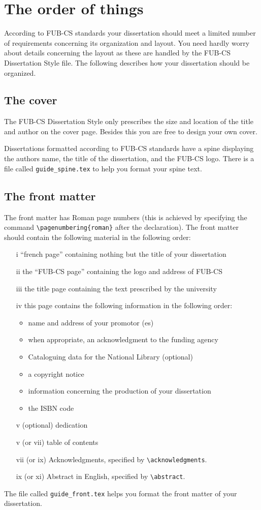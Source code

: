 \chapter{The order of things}
According to FUB-CS standards your dissertation should meet a limited number
of requirements concerning its organization and layout. You need hardly 
worry about details concerning the layout as these are handled by the
FUB-CS Dissertation Style file. The following describes how your dissertation
should be organized.

\section{The cover}
The FUB-CS Dissertation Style only prescribes the size and location 
of the title and author on the cover page. Besides this you are free to 
design your own cover.

Dissertations formatted according to FUB-CS standards have a spine displaying
the authors name, the title of the dissertation, and the FUB-CS logo.
There is a file called {\tt guide\_spine.tex} to help you format 
your spine text.


\section{The front matter}
The front matter has Roman page numbers (this is achieved by
specifying the command \verb|\pagenumbering{roman}| after the 
\verb|| declaration). The front matter should contain 
the following material in the following order:
\begin{enumerate}
\item[i]
``french page'' containing nothing but the title of your dissertation
\item[ii]
the ``FUB-CS page'' containing the logo and address of FUB-CS
\item[iii]
the title page containing the text prescribed by the university
\item[iv]
this page contains the following information in the following order:
	\begin{itemize}
	\item
	name and address of your promotor (es)
	\item
	when appropriate, an acknowledgment to the funding agency
	\item
	Cataloguing data for the National Library (optional)
	\item
	a copyright notice
	\item
	information concerning the production of your dissertation
	\item
	the ISBN code
	\end{itemize}
\item[v] (optional)
dedication
\item[v] (or vii)
table of contents
\item[vii] (or ix)
Acknowledgments, specified by \verb|\acknowledgments|.
\item[ix] (or xi)
Abstract in English, specified by \verb|\abstract|.
\end{enumerate}
The file called  \verb|guide_front.tex| helps you format
the front matter of your dissertation.


